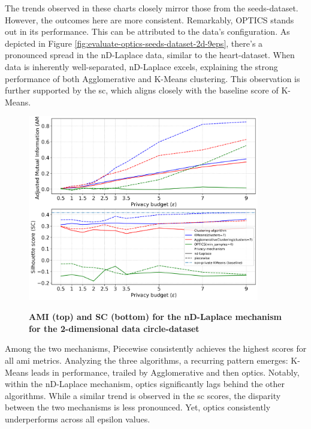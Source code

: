 The trends observed in these charts closely mirror those from the seeds-dataset. However, the outcomes here are more consistent. Remarkably, OPTICS stands out in its performance. This can be attributed to the data's configuration. As depicted in Figure \ref{fig:evaluate-optics-seeds-dataset-2d-9eps}, there's a pronounced spread in the nD-Laplace data, similar to the heart-dataset. When data is inherently well-separated, nD-Laplace excels, explaining the strong performance of both Agglomerative and K-Means clustering. This observation is further supported by the \gls{sc}, which aligns closely with the baseline score of K-Means.
\newpage
\begin{figure}[H]
  \centering
  \caption{\textbf{AMI (top) and SC (bottom) for the nD-Laplace mechanism for the 2-dimensional data circle-dataset}}
  \includegraphics[width=0.9\textwidth]{Results/nd-laplace/nd-Laplace/circle-dataset/ami-and-sc_2_dimensions.png}
  \label{fig:validation-circle-dataset_comparison_2d-laplace}
\end{figure}
Among the two mechanisms, Piecewise consistently achieves the highest scores for all \gls{ami} metrics. Analyzing the three algorithms, a recurring pattern emerges: K-Means leads in performance, trailed by Agglomerative and then \gls{optics}. Notably, within the nD-Laplace mechanism, \gls{optics} significantly lags behind the other algorithms. While a similar trend is observed in the \gls{sc} scores, the disparity between the two mechanisms is less pronounced. Yet, \gls{optics} consistently underperforms across all epsilon values.

